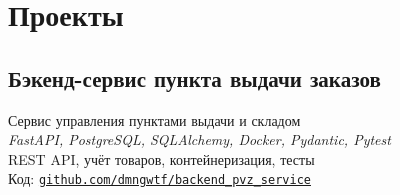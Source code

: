 \documentclass[a4paper,12pt]{article}
\begin{document}
	\vspace{10pt}
	
	
	
	
	\section*{Проекты}
	
	\subsection*{Бэкенд-сервис пункта выдачи заказов}
	Сервис управления пунктами выдачи и складом \\
	\textit{FastAPI, PostgreSQL, SQLAlchemy, Docker, Pydantic, Pytest}\\  
	REST API, учёт товаров, контейнеризация, тесты\\
	{Код: \href{https://github.com/dmngwtf/backend_pvz_service}{\texttt{github.com/dmngwtf/backend\_pvz\_service}}}

		
		
	
\end{document}
